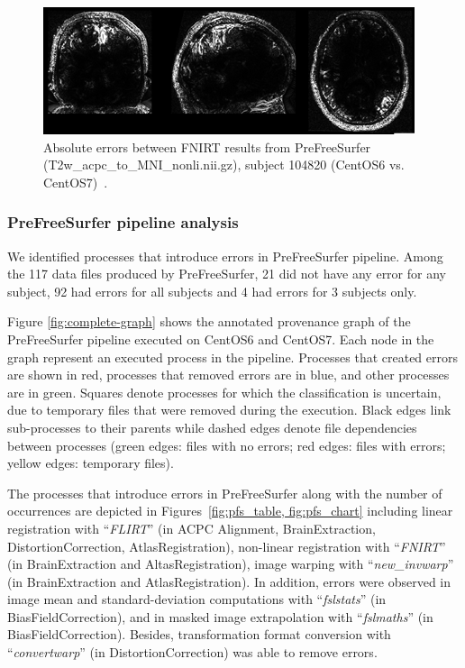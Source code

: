 \documentclass[a4paper,num-refs]{oup-contemporary}
\begin{document}
\begin{figure}
\centering
  \includegraphics[width=\columnwidth]{images/fnirt_result.png} 
  \caption{Absolute errors between FNIRT results from PreFreeSurfer 
  (T2w\_acpc\_to\_MNI\_nonli.nii.gz), subject 104820 (CentOS6 vs. 
  CentOS7)~\cite{Scaria2017}. } 
  \label{fig:fnirt_result}
\end{figure}

\subsubsection{PreFreeSurfer pipeline analysis} 

We identified processes that introduce errors in PreFreeSurfer 
pipeline. Among the 117 data files produced by PreFreeSurfer, 21 did 
not have any error for any subject, 92 had errors for all subjects and 
4 had errors for 3 subjects only. 

Figure \ref{fig:complete-graph} shows the annotated provenance graph 
of the PreFreeSurfer pipeline executed on CentOS6 and CentOS7. Each 
node in the graph represent an executed process in the pipeline. 
Processes that created errors are shown in red, processes that removed 
errors are in blue, and other processes are in green.  Squares denote 
processes for which the classification is uncertain, due to temporary 
files that were removed during the execution. Black edges link 
sub-processes to their parents while dashed edges denote file 
dependencies between processes (green edges: files with no errors; red 
edges: files with errors; yellow edges: temporary files).

The processes that introduce errors in PreFreeSurfer along with the 
number of occurrences are depicted in Figures~\ref{fig:pfs_table, 
fig:pfs_chart} including linear registration with “\emph{FLIRT}” (in 
ACPC Alignment, BrainExtraction, DistortionCorrection, 
AtlasRegistration), non-linear registration with “\emph{FNIRT}” (in 
BrainExtraction and AltasRegistration), image warping with 
“\emph{new\_invwarp}” (in BrainExtraction and AtlasRegistration).  In 
addition, errors were observed in image mean and standard-deviation 
computations with “\emph{fslstats}” (in BiasFieldCorrection), and in 
masked image extrapolation with “\emph{fslmaths}” (in 
BiasFieldCorrection).  Besides, transformation format conversion with 
“\emph{convertwarp}” (in DistortionCorrection) was able to remove 
errors.
\end{document}
